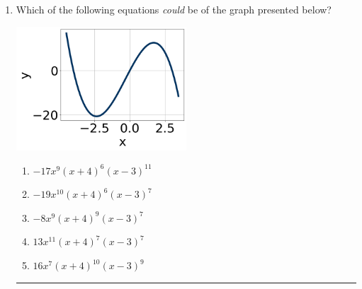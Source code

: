 \documentclass[14pt]{extbook}
\newcommand{\litem}[1]{\item#1\hspace*{-1cm}\rule{\textwidth}{0.4pt}}
\begin{document}
\begin{enumerate}
{\begin{enumerate}[label=\Alph*.]
\end{enumerate} }
\litem{
Which of the following equations \textit{could} be of the graph presented below?
\begin{center}
    \includegraphics[width=0.5\textwidth]{../Figures/polyGraphToFunctionCopyC.png}
\end{center}
\begin{enumerate}[label=\Alph*.]
\item \( -17x^{9} (x + 4)^{6} (x - 3)^{11} \)
\item \( -19x^{10} (x + 4)^{6} (x - 3)^{7} \)
\item \( -8x^{9} (x + 4)^{9} (x - 3)^{7} \)
\item \( 13x^{11} (x + 4)^{7} (x - 3)^{7} \)
\item \( 16x^{7} (x + 4)^{10} (x - 3)^{9} \)


\end{enumerate}}
\end{enumerate}
\end{document}
